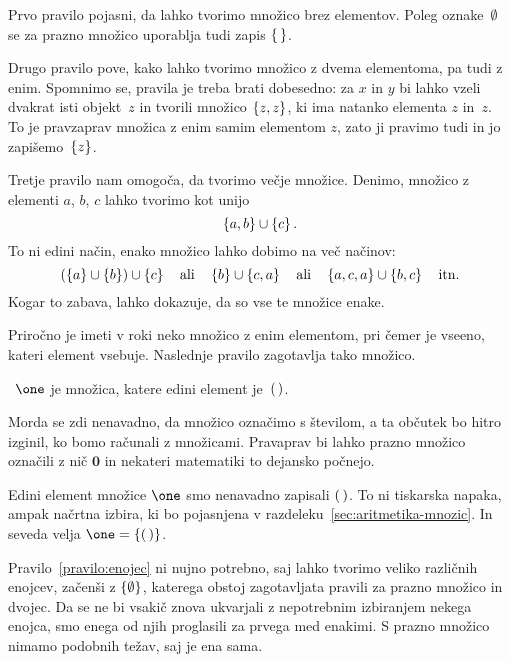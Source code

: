 Prvo pravilo pojasni, da lahko tvorimo množico brez elementov.
Poleg oznake~$\emptyset$ se za prazno množico uporablja tudi zapis $\left\{\,\right\}$.

Drugo pravilo pove, kako lahko tvorimo množico z dvema elementoma, pa tudi z enim.
Spomnimo se, pravila je treba brati dobesedno: za $x$ in $y$ bi lahko vzeli dvakrat isti
objekt~$z$ in tvorili množico $\left\{z, z\right\}$, ki ima natanko elementa $z$ in~$z$. To je
pravzaprav množica z enim samim elementom $z$, zato ji pravimo tudi  in jo
zapišemo~$\left\{z\right\}$.

Tretje pravilo nam omogoča, da tvorimo večje množice. Denimo, množico z elementi $a$, $b$,
$c$ lahko tvorimo kot unijo
%
\begin{equation*}
  \left\{a, b\right\} \cup \left\{c\right\}.
\end{equation*}
%
To ni edini način, enako množico lahko dobimo na več načinov:
%
\begin{equation*}
  (\left\{a\right\} \cup \left\{b\right\}) \cup \left\{c\right\}
  \quad\text{ali}\quad
  \left\{b\right\} \cup \left\{c, a\right\}
  \quad\text{ali}\quad
  \left\{a,c,a\right\} \cup \left\{b,c\right\}
  \quad\text{itn.}
\end{equation*}
%
Kogar to zabava, lahko dokazuje, da so vse te množice enake.

Priročno je imeti v roki neko množico z enim elementom, pri čemer je vseeno, kateri element vsebuje.
%
Naslednje pravilo zagotavlja tako množico.

\begin{pravilo}
  \label{pravilo:enojec}
  ~$\one$ je množica, katere edini element je~$(\,)$.
\end{pravilo}

Morda se zdi nenavadno, da množico označimo s številom, a ta občutek bo hitro izginil, ko
bomo računali z množicami. Pravaprav bi lahko prazno množico označili z nič $\mathbf{0}$
in nekateri matematiki to dejansko počnejo.

Edini element množice $\one$ smo nenavadno zapisali $(\,)$. To ni tiskarska napaka,
ampak načrtna izbira, ki bo pojasnjena v razdeleku~\ref{sec:aritmetika-mnozic}.
In seveda velja $\one = \set{\unit}$.

Pravilo~\ref{pravilo:enojec} ni nujno potrebno, saj lahko tvorimo veliko različnih enojcev,
začenši z $\left\{\emptyset\right\}$, katerega obstoj zagotavljata pravili za prazno množico in dvojec.
Da se ne bi vsakič znova ukvarjali z nepotrebnim izbiranjem nekega enojca, smo enega od njih
proglasili za prvega med enakimi. S prazno množico nimamo podobnih težav, saj je ena sama.

